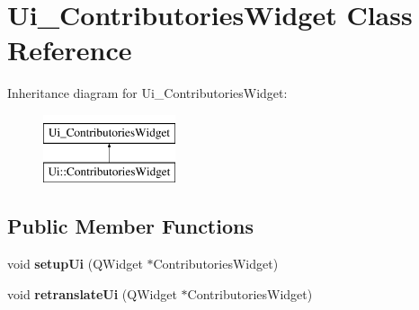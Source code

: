\hypertarget{classUi__ContributoriesWidget}{\section{Ui\-\_\-\-Contributories\-Widget Class Reference}
\label{classUi__ContributoriesWidget}
}
Inheritance diagram for Ui\-\_\-\-Contributories\-Widget\-:\begin{figure}[H]
\begin{center}
\leavevmode
\includegraphics[height=2.000000cm]{dd/d83/classUi__ContributoriesWidget}
\end{center}
\end{figure}
\subsection*{Public Member Functions}
\begin{DoxyCompactItemize}
\item 
\hypertarget{classUi__ContributoriesWidget_aeb538e14848329059289f3715bfaf043}{void {\bfseries setup\-Ui} (Q\-Widget $\ast$Contributories\-Widget)}\label{classUi__ContributoriesWidget_aeb538e14848329059289f3715bfaf043}

\item 
\hypertarget{classUi__ContributoriesWidget_ac16a55af65065b86b9485933334d0752}{void {\bfseries retranslate\-Ui} (Q\-Widget $\ast$Contributories\-Widget)}\label{classUi__ContributoriesWidget_ac16a55af65065b86b9485933334d0752}

\end{DoxyCompactItemize}
